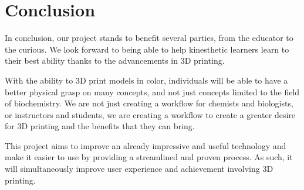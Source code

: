 \documentclass[letterpaper, onecolumn, draftclsnofoot, 10pt, compsoc]{IEEEtran}
\begin{document}
\section{Conclusion}
    \begin{singlespace}
        In conclusion, our project stands to benefit several parties, from the educator to the curious. We look forward to being able to help kinesthetic learners learn to their best ability thanks to the advancements in 3D printing.\par
        With the ability to 3D print models in color, individuals will be able to have a better physical grasp on many concepts, and not just concepts limited to the field of biochemistry. We are not just creating a workflow for chemists and biologists, or instructors and students, we are creating a workflow to create a greater desire for 3D printing and the benefits that they can bring.\par
        This project aims to improve an already impressive and useful technology and make it easier to use by providing a streamlined and proven process. As such, it will simultaneously improve user experience and achievement involving 3D printing.\par
    \end{singlespace}

{}

\end{document}
